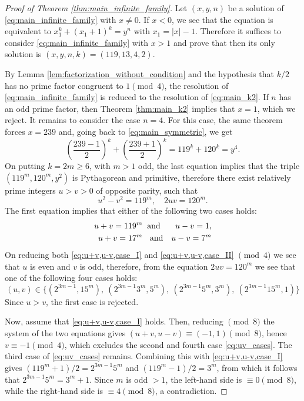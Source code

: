 \documentclass[12pt]{amsart}
\numberwithin{equation}{section}
\theoremstyle{definition}
\theoremstyle{remark}
\begin{document}
\begin{proof}[Proof of Theorem \ref{thm:main_infinite_family}]
Let $(x,y,n)$ be a solution of \eqref{eq:main_infinite_family}
with $x\ne 0$.
If $x<0$, we see that the equation is equivalent to 
$x_1^k+(x_1+1)^k=y^n$ with $x_1=|x|-1$. Therefore it suffices 
to consider \eqref{eq:main_infinite_family} with $x>1$ and prove
that then its only solution is $(x,y,n,k)=(119,13,4,2)$.

By Lemma \ref{lem:factorization_without_condition} and the hypothesis that $k/2$ has no 
prime factor congruent to $1\pmod{4}$, the resolution of 
\eqref{eq:main_infinite_family} is reduced to the 
resolution of \eqref{eq:main_k2}. If $n$ has an odd prime factor, 
then Theorem \ref{thm:main_k2} implies that $x=1$, which we reject. 
It remains to consider the case $n=4$. For this case, the same 
theorem forces $x=239$ and, going back to \eqref{eq:main_symmetric}, 
we get
%
\begin{equation*}
    \left(\frac{239 - 1}{2}\right)^k + \left(\frac{239 + 1}{2}\right)^k = 119^k+120^k=y^4.
\end{equation*}
%
On putting $k=2m\geq 6$, with $m>1$ odd, the last equation implies that the triple $(119^m, 120^m,y^2)$ is Pythagorean and primitive, therefore there exist relatively prime integers $u>v>0$ of opposite parity, such that
%
\begin{equation*}
    u^2-v^2=119^m,\quad 2uv=120^m.
\end{equation*}
%
The first equation implies that either of the following two cases
holds:
%
\begin{eqnarray}
     u+v=119^m & \text{\;\;and} & u-v=1, \label{eq:u+v,u-v,case_I}
     \\
     u+v=17^m & \text{\;\; and} & u-v=7^m \label{eq:u+v,u-v,case_II}
\end{eqnarray}
%
On reducing both \eqref{eq:u+v,u-v,case_I} and \eqref{eq:u+v,u-v,case_II} $\pmod 4$ we see that $u$ is even and $v$ is 
odd, therefore, from the equation $2uv=120^m$ we see that one of the 
following four cases holds:
%
\begin{equation} \label{eq:uv_cases}
    (u,v) \in \{(2^{3m-1}, 15^m),\: (2^{3m-1}3^m,5^m),\:
    (2^{3m-1}5^m,3^m),\:(2^{3m-1}15^m,1)\}
\end{equation}
%
Since $u>v$, the first case is rejected. 

Now, assume that \eqref{eq:u+v,u-v,case_I} holds. Then, reducing
$\pmod 8$ the system of the two equations gives 
$(u+v, u-v) \equiv (-1,1)\pmod 8$, hence $v\equiv -1\pmod 4$, which
excludes the second and fourth case \eqref{eq:uv_cases}.
The third case of \eqref{eq:uv_cases} remains. Combining this with
\eqref{eq:u+v,u-v,case_I} gives $(119^m+1)/2=2^{3m-1}5^m$ and
$(119^m-1)/2=3^m$, from which it follows that 
$2^{3m-1}5^m=3^m+1$. Since $m$ is odd $>1$, the left-hand side is 
$\equiv 0\pmod 8$, while the right-hand side is $\equiv 4\pmod 8$,
a contradiction.  


\end{proof}
\end{document}
